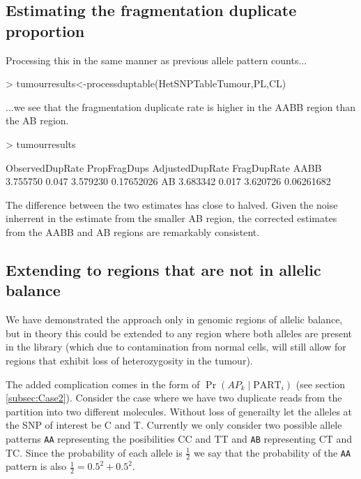 \documentclass{article}
\begin{document}
\subsection{Estimating the fragmentation duplicate proportion}

Processing this in the same manner as previous allele pattern counts...

\begin{Schunk}
\begin{Sinput}
> tumourresults<-processduptable(HetSNPTableTumour,PL,CL)
\end{Sinput}
\end{Schunk}

...we see that the fragmentation duplicate rate is higher in the AABB region than the AB region.

\begin{Schunk}
\begin{Sinput}
> tumourresults
\end{Sinput}
\begin{Soutput}
     ObservedDupRate PropFragDups AdjustedDupRate FragDupRate
AABB        3.755750        0.047        3.579230  0.17652026
AB          3.683342        0.017        3.620726  0.06261682
\end{Soutput}
\end{Schunk}




The difference between the two estimates has close to halved. Given the noise inherrent in the estimate from the smaller AB region, the corrected estimates from the AABB and AB regions are remarkably consistent.

\subsection{Extending to regions that are not in allelic balance}

We have demonstrated the approach only in genomic regions of allelic balance, but in theory this could be extended to any region where both alleles are present in the library (which due to contamination from normal cells, will still allow for regions that exhibit loss of heterozygosity in the tumour). 

The added complication comes in the form of $\Pr(AP_k \mid \text{PART}_i)$ (see section \ref{subsec:Case2}). Consider the case where we have two duplicate reads from the partition into two different molecules. Without loss of generailty let the alleles at the SNP of interest be C and T. Currently we only consider two possible allele patterns \texttt{AA} representing the posibilities CC and TT and \texttt{AB} representing CT and TC. Since the probability of each allele is $\frac{1}{2}$ we say that the probability of the \texttt{AA} pattern is also $\frac{1}{2} = 0.5^2 + 0.5^2$. 
\end{document}
